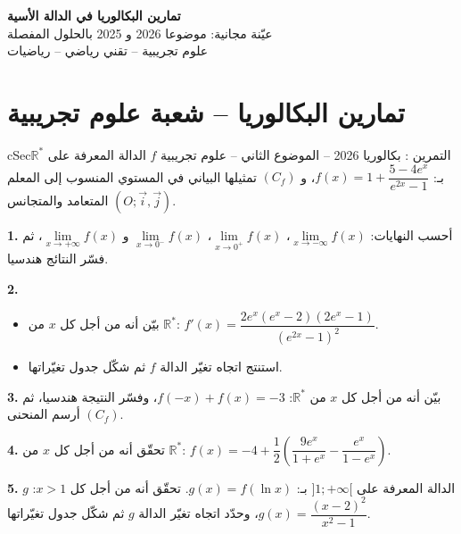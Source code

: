 \documentclass[12pt,a4paper]{article}
\newenvironment{BOX}[2]{\begin{otherlanguage}{english}\begin{arbox}{#1}{#2}}{\end{arbox}\end{otherlanguage}}
\newcounter{exo}
\newenvironment{tamrin}[1]{\stepcounter{exo}\begin{BOX}{cSec}{التمرين \theexo: #1}}{\end{BOX}}
\newenvironment{LTR}{\begin{otherlanguage}{english}}{\end{otherlanguage}}
\newcommand{\R}{\mathbb{R}}
\newenvironment{sq}{\begin{itemize}[leftmargin=2.4em,itemsep=3pt]}{\end{itemize}}
\newcommand{\qa}{\item[(أ)]}\newcommand{\qb}{\item[(ب)]}\newcommand{\qc}{\item[(جـ)]}\newcommand{\qd}{\item[(د)]}\newcommand{\qe}{\item[(هـ)]}
\newcommand{\QQ}[1]{\par\smallskip\textbf{#1.} }
\begin{document}
\begin{LTR}
\begin{tcolorbox}[enhanced,colback=cSec,colframe=cSec,arc=3mm,halign=center,boxrule=0pt,top=12pt,bottom=12pt,before upper={\selectlanguage{arabic}}]
{\color{white}\fontsize{26}{32}\selectfont\bfseries تمارين البكالوريا في الدالة الأسية}\\[8pt]
{\color{white}\large عيّنة مجانية: موضوعا 2026 و 2025 بالحلول المفصلة}\\[5pt]
{\color{white}\large علوم تجريبية -- تقني رياضي -- رياضيات}
\end{tcolorbox}
\end{LTR}
\section{تمارين البكالوريا -- شعبة علوم تجريبية}
\begin{tamrin}{بكالوريا 2026 -- الموضوع الثاني -- علوم تجريبية}
$f$ الدالة المعرفة على $\R^{*}$ بـ: $f(x)=1+\dfrac{5-4e^{x}}{e^{2x}-1}$، و $(C_f)$ تمثيلها البياني في المستوي المنسوب إلى المعلم المتعامد والمتجانس $(O;\vec i,\vec j)$.
\QQ{1} أحسب النهايات: $\lim\limits_{x\to-\infty}f(x)$، $\lim\limits_{x\to0^{+}}f(x)$، $\lim\limits_{x\to0^{-}}f(x)$ و $\lim\limits_{x\to+\infty}f(x)$، ثم فسّر النتائج هندسيا.
\QQ{2}
\begin{sq}
\qa بيّن أنه من أجل كل $x$ من $\R^{*}$: $f'(x)=\dfrac{2e^{x}\left(e^{x}-2\right)\left(2e^{x}-1\right)}{\left(e^{2x}-1\right)^{2}}$.
\qb استنتج اتجاه تغيّر الدالة $f$ ثم شكّل جدول تغيّراتها.
\end{sq}
\QQ{3} بيّن أنه من أجل كل $x$ من $\R^{*}$: $f(-x)+f(x)=-3$، وفسّر النتيجة هندسيا، ثم أرسم المنحنى $(C_f)$.
\QQ{4} تحقّق أنه من أجل كل $x$ من $\R^{*}$: $f(x)=-4+\dfrac{1}{2}\left(\dfrac{9e^{x}}{1+e^{x}}-\dfrac{e^{x}}{1-e^{x}}\right)$.
\QQ{5} $g$ الدالة المعرفة على $]1;+\infty[$ بـ: $g(x)=f(\ln x)$.
تحقّق أنه من أجل كل $x>1$: $g(x)=\dfrac{(x-2)^{2}}{x^{2}-1}$، وحدّد اتجاه تغيّر الدالة $g$ ثم شكّل جدول تغيّراتها.
\end{tamrin}
\end{document}

